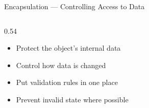 \begin{frame}{Encapsulation — Controlling Access to Data}
\begin{columns}[T]
        \begin{column}{0.54\textwidth}

            \vspace{0.15cm}

            \begin{itemize}

                \item Protect the object's internal data

                \vspace{0.25cm}

                \item Control how data is changed

                \vspace{0.25cm}

                \item Put validation rules in one place

                \vspace{0.25cm}

                \item Prevent invalid state where possible

            \end{itemize}

        \end{column}

    \end{columns}


    \vfill

    \begin{center}


    \end{center}

\end{frame}